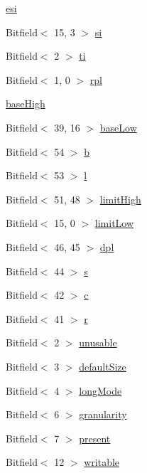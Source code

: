 \begin{DoxyCompactItemize}
\item 
\hyperlink{namespaceX86ISA_a7e14009e76c478216d709ffd6ef7ca95}{esi}
\item 
Bitfield$<$ 15, 3 $>$ \hyperlink{namespaceX86ISA_ab6397ccc8be859399c8226d4c33f6038}{si}
\item 
Bitfield$<$ 2 $>$ \hyperlink{namespaceX86ISA_a012ce16717ac70df826ce474b8c17f27}{ti}
\item 
Bitfield$<$ 1, 0 $>$ \hyperlink{namespaceX86ISA_a9a887e24000290243c61c6b57c31f4f6}{rpl}
\item 
\hyperlink{namespaceX86ISA_a5e3e543cae98291127a676c292cb9a05}{baseHigh}
\item 
Bitfield$<$ 39, 16 $>$ \hyperlink{namespaceX86ISA_ac643c495e93124579f3889d6ed54ac29}{baseLow}
\item 
Bitfield$<$ 54 $>$ \hyperlink{namespaceX86ISA_aa1dc72da091616d43719bbad476ed8c4}{b}
\item 
Bitfield$<$ 53 $>$ \hyperlink{namespaceX86ISA_a440d5dd6001d28c631dac4b038a14fce}{l}
\item 
Bitfield$<$ 51, 48 $>$ \hyperlink{namespaceX86ISA_a29d12cf45203279b3f84597fe52cf0fa}{limitHigh}
\item 
Bitfield$<$ 15, 0 $>$ \hyperlink{namespaceX86ISA_a0a94de1fd530618d4f27ad874b0afe86}{limitLow}
\item 
Bitfield$<$ 46, 45 $>$ \hyperlink{namespaceX86ISA_a41dffe4aaa71ac7f06703ded48a8d507}{dpl}
\item 
Bitfield$<$ 44 $>$ \hyperlink{namespaceX86ISA_a6005be610d16236f9fbe2983286450d1}{s}
\item 
Bitfield$<$ 42 $>$ \hyperlink{namespaceX86ISA_ad4568b476d67559c215a39c30cb3cb51}{c}
\item 
Bitfield$<$ 41 $>$ \hyperlink{namespaceX86ISA_a2d74a64c58dba52c76570d1737436cc1}{r}
\item 
Bitfield$<$ 2 $>$ \hyperlink{namespaceX86ISA_a3b73506caed4af258dcfbccf6daa767a}{unusable}
\item 
Bitfield$<$ 3 $>$ \hyperlink{namespaceX86ISA_a600531f9484be78cb9a5bda7d6d3a368}{defaultSize}
\item 
Bitfield$<$ 4 $>$ \hyperlink{namespaceX86ISA_abc6881302bbd5f7f1ee169c3788fa86b}{longMode}
\item 
Bitfield$<$ 6 $>$ \hyperlink{namespaceX86ISA_ac78b0b5771632d3bcbedc962ab8220a1}{granularity}
\item 
Bitfield$<$ 7 $>$ \hyperlink{namespaceX86ISA_a2c4bc7438a48bd4bbdd7ed9b629a6ec6}{present}
\item 
Bitfield$<$ 12 $>$ \hyperlink{namespaceX86ISA_a5a2b9e3f7c7a12080c9d48e67f540c98}{writable}

\end{DoxyCompactItemize}
